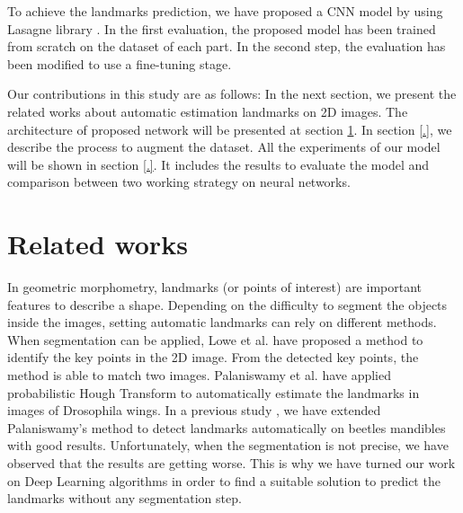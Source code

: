\documentclass[12pt,a4paper]{article}
\begin{document}
To achieve the landmarks prediction, we have proposed a CNN model \cite{.} by using Lasagne library \cite{.}. In the first evaluation, the proposed model has been trained from scratch on the dataset of each part. In the second step, the evaluation has been modified to use a fine-tuning \cite{.} stage.

Our contributions in this study are as follows: In the next section, we present the related works about automatic estimation landmarks on 2D images. The architecture of proposed network will be presented at section \ref{}. In section \ref{.}, we describe the process to augment the dataset. All the experiments of our model will be shown in section \ref{.}. It includes the results to evaluate the model and comparison between two working strategy on neural networks.

\section{Related works}
In geometric morphometry, landmarks (or points of interest) are important features to describe a shape. Depending on the difficulty to segment the objects inside the images, setting automatic landmarks can rely on different methods. When segmentation can be applied, Lowe et al. \cite{.} have proposed a method to identify the key points in the 2D image. From the detected key points, the method is able to match two images. Palaniswamy et al. \cite{.} have applied probabilistic Hough Transform to automatically estimate the landmarks in images
of Drosophila wings. In a previous study \cite{.}, we have extended
Palaniswamy’s method to detect landmarks automatically on
beetles mandibles with good results. Unfortunately, when the
segmentation is not precise, we have observed that the results
are getting worse. This is why we have turned our work on
Deep Learning algorithms in order to find a suitable solution to
predict the landmarks without any segmentation step.
\end{document}

